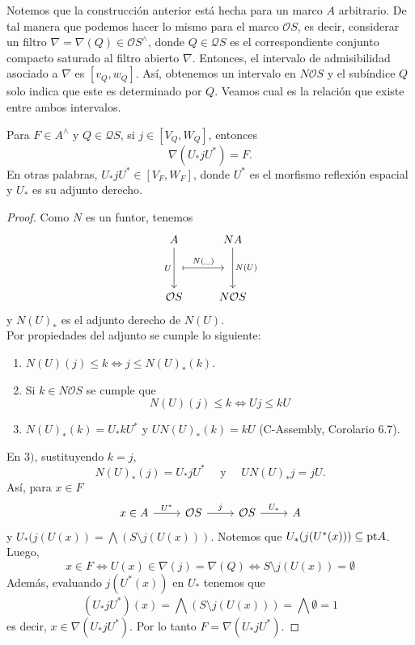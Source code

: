 Notemos que la construcción anterior está hecha para un marco $A$ arbitrario. De tal manera que podemos hacer lo mismo para el marco $\mathcal{O}S$, es decir, considerar un filtro $\nabla=\nabla(Q)\in \mathcal{O}S^\wedge$, donde $Q\in \mathcal{Q}S$ es el correspondiente conjunto compacto saturado al filtro abierto $\nabla$. Entonces, el intervalo de admisibilidad asociado a $\nabla$ es $[v_Q, w_Q]$. 
Así, obtenemos un intervalo en $N\mathcal{O}S$ y el subíndice $Q$ solo indica que este es determinado por $Q$. Veamos cual es la relación que existe entre ambos intervalos.

\begin{prop}
    Para $F\in A^\wedge$ y $Q\in \mathcal{Q}S$, si $j\in [V_Q, W_Q]$, entonces 
    \[
    \nabla(U_* j U^*)=F.
    \]
    En otras palabras, $U_*jU^*\in [V_F,W_F]$, donde $U^*$ es el morfismo reflexión espacial y $U_*$ es su adjunto derecho.
\end{prop}

\begin{proof}
    Como $N$ es un funtor, tenemos
   \[\begin{tikzcd}
	A & NA \\
	\\
	{\mathcal{O}S} & {N\mathcal{O}S}
	\arrow[""{name=0, anchor=center, inner sep=0}, "U"', from=1-1, to=3-1]
	\arrow[""{name=1, anchor=center, inner sep=0}, "{N(U)}", from=1-2, to=3-2]
	\arrow["{N(\_)}", shorten <=7pt, shorten >=7pt, maps to, from=0, to=1]
\end{tikzcd}\]
y $N(U)_*$ es el adjunto derecho de $N(U)$.\\

Por propiedades del adjunto se cumple lo siguiente:
\begin{enumerate}
    \item $N(U)(j)\leq k\Leftrightarrow j\leq N(U)_*(k)$.
    \item Si $k\in N\mathcal{O}S$ se cumple que 
    \[
    N(U)(j)\leq k\Leftrightarrow Uj\leq kU
    \]
    \item $N(U)_*(k)=U_*kU^*$ y $UN(U)_*(k)=kU$ (C-Assembly, Corolario 6.7).
\end{enumerate}
En $3)$, sustituyendo $k=j$,  
\[
N(U)_*(j)=U_*jU^* \quad\mbox{ y }\quad UN(U)_*j=jU.
\] 
Así, para $x\in F$
\[\begin{tikzcd}
	x\in A & {\mathcal{O}S} & {\mathcal{O}S} & A
	\arrow["{U^*}", from=1-1, to=1-2]
	\arrow["j", from=1-2, to=1-3]
	\arrow["{U_*}", from=1-3, to=1-4]
\end{tikzcd}\]
y $U_*(j(U(x))=\bigwedge(S\setminus j(U(x)))$. Notemos que $U_*(j(U^*(x)))\subseteq \mathrm{pt} A$. Luego,
\[
x\in F \Leftrightarrow U(x)\in \nabla(j)=\nabla(Q)\Leftrightarrow S\setminus j(U(x))=\emptyset
\]
Además, evaluando $j(U^*(x))$ en $U_*$ tenemos que 
\[
(U_*jU^*)(x)=\bigwedge (S\setminus j(U(x)))=\bigwedge\emptyset=1
\]
es decir, $x\in \nabla(U_*jU^*)$. Por lo tanto $F=\nabla(U_*jU^*)$.
\end{proof}

